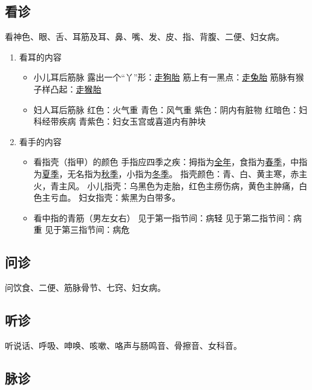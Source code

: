 \documentclass[cn,hazy,black,12pt,normal,founder]{elegantnote}
\newcommand{\redt}[1]{\textcolor{black}{{}#1}}      %
\begin{document}

\subsection{看诊}

看神色、眼、舌、耳筋及耳、鼻、嘴、发、皮、指、背腹、二便、妇女病。

\begin{enumerate}
  \item 看耳的内容
  \begin{itemize}
    \item 小儿耳后筋脉
    \subitem 露出一个“丫”形：\uline{走\redt{狗}胎}
    \subitem 筋上有一黑点：\uline{走\redt{兔}胎}
    \subitem 筋脉有猴子样凸起：\uline{走\redt{猴}胎}
    \item 妇人耳后筋脉
    \subitem 红色：火气重
    \subitem 青色：风气重
    \subitem 紫色：阴内有脏物
    \subitem 红暗色：妇科经带疾病
    \subitem 青紫色：妇女玉宫或喜道内有肿块
  \end{itemize}
  \item 看手的内容
  \begin{itemize}
    \item 看指壳（指甲）的颜色
    \subitem 手指应四季之疾：拇指为\uline{全年}，食指为\uline{春季}，中指为\uline{夏季}，无名指为\uline{秋季}，小指为\uline{冬季}。
    \subitem 指壳颜色：青、白、黄主寒，赤主火，青主风。
    \subitem 小儿指壳：乌黑色为走胎，红色主痨伤病，黄色主肿痛，白色主亏血。
    \subitem 妇女指壳：紫黑为白带多。
    \item 看中指的青筋（男左女右）
    \subitem 见于第\redt{一}指节间：病\redt{轻}
    \subitem 见于第\redt{二}指节间：病\redt{重}
    \subitem 见于第\redt{三}指节间：病\redt{危}
  \end{itemize}
\end{enumerate}

\subsection{问诊}

问饮食、二便、筋脉骨节、七窍、妇女病。

\subsection{听诊}

听说话、呼吸、呻唤、咳嗽、咯声与肠鸣音、骨擦音、女科音。

\subsection{脉诊}
\end{document}
